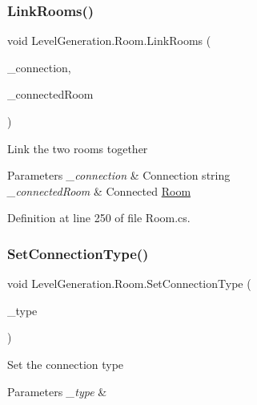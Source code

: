 \subsubsection{\texorpdfstring{Link\+Rooms()}{LinkRooms()}}
{\footnotesize\ttfamily void Level\+Generation.\+Room.\+Link\+Rooms (\begin{DoxyParamCaption}\item[{string}]{\+\_\+connection,  }\item[{\mbox{\hyperlink{class_level_generation_1_1_room}{Room}}}]{\+\_\+connected\+Room }\end{DoxyParamCaption})}



Link the two rooms together 


\begin{DoxyParams}{Parameters}
{\em \+\_\+connection} & Connection string\\
\hline
{\em \+\_\+connected\+Room} & Connected \mbox{\hyperlink{class_level_generation_1_1_room}{Room}}\\
\hline
\end{DoxyParams}


Definition at line 250 of file Room.\+cs.

\mbox{\label{class_level_generation_1_1_room_ae07be6a48b5fa0b1eff3b2ed08be2206}} 
\subsubsection{\texorpdfstring{Set\+Connection\+Type()}{SetConnectionType()}}
{\footnotesize\ttfamily void Level\+Generation.\+Room.\+Set\+Connection\+Type (\begin{DoxyParamCaption}\item[{\mbox{\hyperlink{namespace_level_generation_ac48934e101078b19dce3479d82f689e0}{Connection\+Type}}}]{\+\_\+type }\end{DoxyParamCaption})}



Set the connection type 


\begin{DoxyParams}{Parameters}
{\em \+\_\+type} & \\
\hline
\end{DoxyParams}


